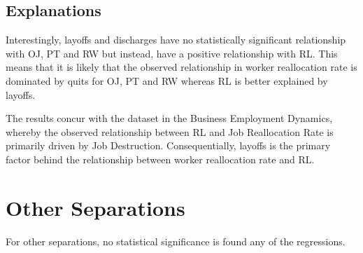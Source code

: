 \documentclass[
]{article}
\begin{document}
\hypertarget{explanations-2}{%
\subsection{Explanations}\label{explanations-2}}

Interestingly, layoffs and discharges have no statistically significant
relationship with OJ, PT and RW but instead, have a positive
relationship with RL. This means that it is likely that the observed
relationship in worker reallocation rate is dominated by quits for OJ,
PT and RW whereas RL is better explained by layoffs.

The results concur with the dataset in the Business Employment Dynamics,
whereby the observed relationship between RL and Job Reallocation Rate
is primarily driven by Job Destruction. Consequentially, layoffs is the
primary factor behind the relationship between worker reallocation rate
and RL.

\hypertarget{other-separations}{%
\section{Other Separations}\label{other-separations}}

For other separations, no statistical significance is found any of the
regressions.
\end{document}
